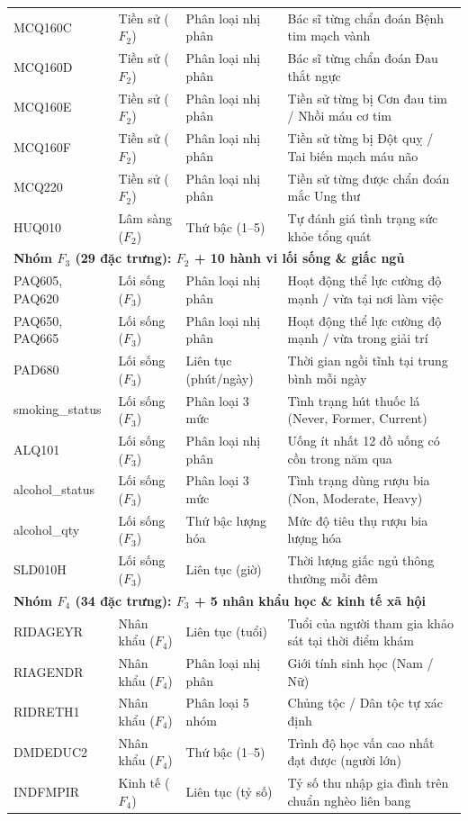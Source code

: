 \begin{longtable}{p{2.5cm} p{2.2cm} p{2.5cm} p{6.5cm}}
MCQ160C & Tiền sử ($F_2$) & Phân loại nhị phân & Bác sĩ từng chẩn đoán Bệnh tim mạch vành \\
MCQ160D & Tiền sử ($F_2$) & Phân loại nhị phân & Bác sĩ từng chẩn đoán Đau thắt ngực \\
MCQ160E & Tiền sử ($F_2$) & Phân loại nhị phân & Tiền sử từng bị Cơn đau tim / Nhồi máu cơ tim \\
MCQ160F & Tiền sử ($F_2$) & Phân loại nhị phân & Tiền sử từng bị Đột quỵ / Tai biến mạch máu não \\
MCQ220 & Tiền sử ($F_2$) & Phân loại nhị phân & Tiền sử từng được chẩn đoán mắc Ung thư \\
HUQ010 & Lâm sàng ($F_2$) & Thứ bậc (1--5) & Tự đánh giá tình trạng sức khỏe tổng quát \\
\midrule
\multicolumn{4}{l}{\textbf{Nhóm $F_3$ (29 đặc trưng): $F_2$ + 10 hành vi lối sống \& giấc ngủ}} \\
PAQ605, PAQ620 & Lối sống ($F_3$) & Phân loại nhị phân & Hoạt động thể lực cường độ mạnh / vừa tại nơi làm việc \\
PAQ650, PAQ665 & Lối sống ($F_3$) & Phân loại nhị phân & Hoạt động thể lực cường độ mạnh / vừa trong giải trí \\
PAD680 & Lối sống ($F_3$) & Liên tục (phút/ngày) & Thời gian ngồi tĩnh tại trung bình mỗi ngày \\
smoking\_status & Lối sống ($F_3$) & Phân loại 3 mức & Tình trạng hút thuốc lá (Never, Former, Current) \\
ALQ101 & Lối sống ($F_3$) & Phân loại nhị phân & Uống ít nhất 12 đồ uống có cồn trong năm qua \\
alcohol\_status & Lối sống ($F_3$) & Phân loại 3 mức & Tình trạng dùng rượu bia (Non, Moderate, Heavy) \\
alcohol\_qty & Lối sống ($F_3$) & Thứ bậc lượng hóa & Mức độ tiêu thụ rượu bia lượng hóa \\
SLD010H & Lối sống ($F_3$) & Liên tục (giờ) & Thời lượng giấc ngủ thông thường mỗi đêm \\
\midrule
\multicolumn{4}{l}{\textbf{Nhóm $F_4$ (34 đặc trưng): $F_3$ + 5 nhân khẩu học \& kinh tế xã hội}} \\
RIDAGEYR & Nhân khẩu ($F_4$) & Liên tục (tuổi) & Tuổi của người tham gia khảo sát tại thời điểm khám \\
RIAGENDR & Nhân khẩu ($F_4$) & Phân loại nhị phân & Giới tính sinh học (Nam / Nữ) \\
RIDRETH1 & Nhân khẩu ($F_4$) & Phân loại 5 nhóm & Chủng tộc / Dân tộc tự xác định \\
DMDEDUC2 & Nhân khẩu ($F_4$) & Thứ bậc (1--5) & Trình độ học vấn cao nhất đạt được (người lớn) \\
INDFMPIR & Kinh tế ($F_4$) & Liên tục (tỷ số) & Tỷ số thu nhập gia đình trên chuẩn nghèo liên bang \\
\end{longtable}
